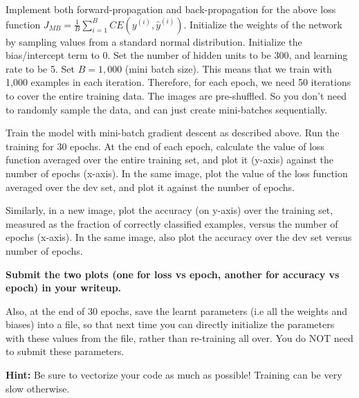 \item {} 

Implement both forward-propagation and back-propagation for the above loss function $J_{MB} = \frac{1}{B}\sum_{i=1}^{B}CE(y^{(i)}, \hat{y}^{(i)})$.
Initialize the weights of the network by sampling values from a standard normal
distribution. Initialize the bias/intercept term to 0.
Set the number of hidden units to be 300, and learning rate to be 5. Set $B = 1,000$
(mini batch size). This means that we train with 1,000 examples in each iteration.
Therefore, for each epoch, we need 50 iterations to cover the entire training data.
The images are pre-shuffled. So you don't need to randomly sample the data, and can
just create mini-batches sequentially.


Train the model with mini-batch gradient descent
as described above. Run the training for 30 epochs. At the end of each epoch, calculate
the value of loss function averaged over the entire training set, and plot it
(y-axis) against the number of epochs (x-axis). In the same image, plot the value
of the loss function averaged over the dev set, and plot it against the number of epochs.

Similarly, in a new image, plot the accuracy (on y-axis) over the training set,
measured as the fraction of correctly classified examples, versus the number of epochs
(x-axis). In the same image, also plot the accuracy over the dev set versus number of epochs.

\textbf{Submit the two plots (one for loss vs epoch, another for accuracy vs epoch) in your writeup.}

Also, at the end of 30 epochs, save the learnt parameters (i.e all the weights and biases)
into a file, so that next time you can directly initialize the parameters with
these values from the file, rather than re-training all over. You do NOT need to
submit these parameters.


\textbf{Hint:} Be sure to vectorize your code as much as possible! Training can be
very slow otherwise.
